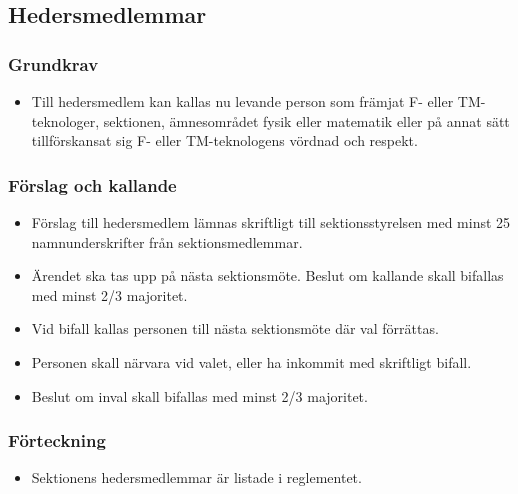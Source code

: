 \documentclass[11pt,a4paper]{article}
\begin{document}

\subsection{Hedersmedlemmar}

\subsubsection{Grundkrav}

\begin{itemize}

  \item Till hedersmedlem kan kallas nu levande person som främjat
  F- eller TM-tekno\-loger, sektionen, ämnesområdet fysik eller matematik eller på annat sätt till\-för\-skansat
  sig F- eller TM-tekno\-logens vördnad och respekt.

\end{itemize}

\subsubsection{Förslag och kallande}

\begin{itemize}

  \item Förslag till hedersmedlem lämnas skriftligt till sektionsstyrelsen med
  minst 25 namnunderskrifter från sektionsmedlemmar.

  \item Ärendet ska tas upp på nästa sektionsmöte. Beslut om kallande
  skall bifallas med minst 2/3 majoritet.

  \item Vid bifall kallas personen till nästa sektionsmöte där val
  förrättas.

  \item Personen skall närvara vid valet, eller ha inkommit med
  skriftligt bifall.

  \item Beslut om inval skall bifallas med minst 2/3 majoritet.

\end{itemize}


\subsubsection{Förteckning}

\begin{itemize}

  \item Sektionens hedersmedlemmar är listade i reglementet.

\end{itemize}
\end{document}
